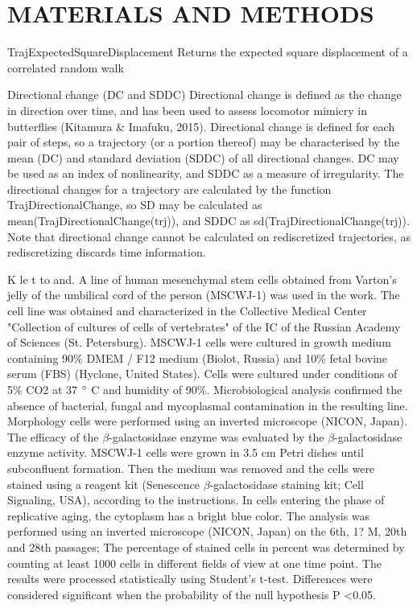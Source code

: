 \documentclass[english,authoryear]{elsarticle}
\begin{document}
\section{MATERIALS AND METHODS}

TrajExpectedSquareDisplacement	Returns the expected square displacement of a correlated random walk


Directional change (DC and SDDC)
Directional change is defined as the change in direction over time, and has been used to assess locomotor mimicry in butterflies (Kitamura & Imafuku, 2015). Directional change is defined for each pair of steps, so a trajectory (or a portion thereof) may be characterised by the mean (DC) and standard deviation (SDDC) of all directional changes. DC may be used as an index of nonlinearity, and SDDC as a measure of irregularity. The directional changes for a trajectory are calculated by the function TrajDirectionalChange, so SD may be calculated as mean(TrajDirectionalChange(trj)), and SDDC as sd(TrajDirectionalChange(trj)). Note that directional change cannot be calculated on rediscretized trajectories, as rediscretizing discards time information.


K le t to and. A line of human mesenchymal stem cells obtained from Varton's jelly of the umbilical cord of the person (MSCWJ-1) was used in the work. The cell line was obtained and characterized in the Collective Medical Center "Collection of cultures of cells of vertebrates" of the IC of the Russian Academy of Sciences (St. Petersburg). MSCWJ-1 cells were cultured in growth medium containing 90\% DMEM / F12 medium (Biolot, Russia) and 10\% fetal bovine serum (FBS) (Hyclone, United States). Cells were cultured under conditions of 5\% CO2 at 37 $\degree$ C and humidity of 90\%. Microbiological analysis confirmed the absence of bacterial, fungal and mycoplasmal contamination in the resulting line.
 Morphology cells were performed using an inverted microscope (NICON, Japan).
The efficacy of the $\beta$-galactosidase enzyme was evaluated by the $\beta$-galactosidase enzyme activity. MSCWJ-1 cells were grown in 3.5 cm Petri dishes until subconfluent formation. Then the medium was removed and the cells were stained using a reagent kit (Senescence $\beta$-galactosidase staining kit; Cell Signaling, USA), according to the instructions. In cells entering the phase of replicative aging, the cytoplasm has a bright blue color. The analysis was performed using an inverted microscope (NICON, Japan) on the 6th, 1? M, 20th and 28th passages; The percentage of stained cells in percent was determined by counting at least 1000 cells in different fields of view at one time point. The results were processed statistically using Student's t-test. Differences were considered significant when the probability of the null hypothesis P <0.05.
\end{document}
